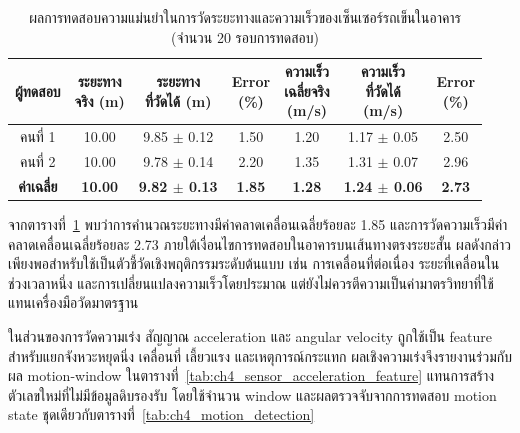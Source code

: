 \begin{table}[!htbp]
    \centering
    \caption[ผลการทดสอบระยะทางและความเร็ว]{ผลการทดสอบความแม่นยำในการวัดระยะทางและความเร็วของเซ็นเซอร์รถเข็นในอาคาร (จำนวน 20 รอบการทดสอบ)}
    \label{tab:ch4_sensor_distance_speed}
    \renewcommand{\arraystretch}{1.2}
    \small
    \begin{tabular}{|c|c|c|c|c|c|c|}
        \hline
        \textbf{ผู้ทดสอบ} & \shortstack{\textbf{ระยะทาง}\\\textbf{จริง (m)}} & \shortstack{\textbf{ระยะทาง}\\\textbf{ที่วัดได้ (m)}} & \shortstack{\textbf{Error}\\\textbf{(\%)}} & \shortstack{\textbf{ความเร็ว}\\\textbf{เฉลี่ยจริง}\\\textbf{(m/s)}} & \shortstack{\textbf{ความเร็ว}\\\textbf{ที่วัดได้}\\\textbf{(m/s)}} & \shortstack{\textbf{Error}\\\textbf{(\%)}} \\ \hline
        คนที่ 1 & 10.00 & 9.85 $\pm$ 0.12 & 1.50 & 1.20 & 1.17 $\pm$ 0.05 & 2.50 \\ \hline
        คนที่ 2 & 10.00 & 9.78 $\pm$ 0.14 & 2.20 & 1.35 & 1.31 $\pm$ 0.07 & 2.96 \\ \hline
        \textbf{ค่าเฉลี่ย} & \textbf{10.00} & \textbf{9.82 $\pm$ 0.13} & \textbf{1.85} & \textbf{1.28} & \textbf{1.24 $\pm$ 0.06} & \textbf{2.73} \\ \hline
    \end{tabular}
\end{table}

จากตารางที่~\ref{tab:ch4_sensor_distance_speed} พบว่าการคำนวณระยะทางมีค่าคลาดเคลื่อนเฉลี่ยร้อยละ 1.85 และการวัดความเร็วมีค่าคลาดเคลื่อนเฉลี่ยร้อยละ 2.73 ภายใต้เงื่อนไขการทดสอบในอาคารบนเส้นทางตรงระยะสั้น ผลดังกล่าวเพียงพอสำหรับใช้เป็นตัวชี้วัดเชิงพฤติกรรมระดับต้นแบบ เช่น การเคลื่อนที่ต่อเนื่อง ระยะที่เคลื่อนในช่วงเวลาหนึ่ง และการเปลี่ยนแปลงความเร็วโดยประมาณ แต่ยังไม่ควรตีความเป็นค่ามาตรวิทยาที่ใช้แทนเครื่องมือวัดมาตรฐาน

ในส่วนของการวัดความเร่ง สัญญาณ acceleration และ angular velocity ถูกใช้เป็น feature สำหรับแยกจังหวะหยุดนิ่ง เคลื่อนที่ เลี้ยวแรง และเหตุการณ์กระแทก ผลเชิงความเร่งจึงรายงานร่วมกับผล motion-window ในตารางที่~\ref{tab:ch4_sensor_acceleration_feature} แทนการสร้างตัวเลขใหม่ที่ไม่มีข้อมูลดิบรองรับ โดยใช้จำนวน window และผลตรวจจับจากการทดสอบ motion state ชุดเดียวกับตารางที่~\ref{tab:ch4_motion_detection}

